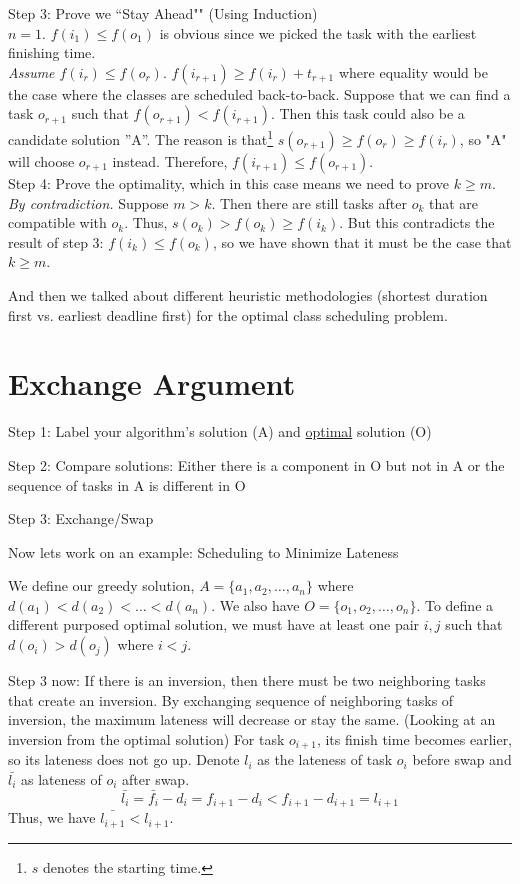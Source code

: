 \documentclass[11pt,letterpaper]{article}
\begin{document}
Step 3: Prove we ``Stay Ahead"" (Using Induction)\\
\textit{$n=1$}. $f(i_1) \leq f(o_1)$ is obvious since we picked the task with the earliest finishing time. \\
\textit{Assume $f(i_r) \leq f(o_r)$}. $f(i_{r+1}) \geq f(i_r) + t_{r+1}$ where equality would be the case where the classes are scheduled back-to-back. Suppose that we can find a task $o_{r+1}$ such that $f(o_{r+1}) < f(i_{r+1})$. Then this task could also be a candidate solution ''A''. The reason is that\footnote{$s$ denotes the starting time.} $s(o_{r+1}) \geq f(o_r) \geq f(i_r)$, so "A" will choose $o_{r+1}$ instead. Therefore, $f(i_{r+1}) \leq f(o_{r+1})$. \\

Step 4: Prove the optimality, which in this case means we need to prove $k \geq m$.\\
\textit{By contradiction.} Suppose $m > k$. Then there are still tasks after $o_k$ that are compatible with $o_k$. Thus, $s(o_k) > f(o_k) \geq f(i_k)$. But this contradicts the result of step 3: $f(i_k) \leq f(o_k)$, so we have shown that it must be the case that $k \geq m$.


And then we talked about different heuristic methodologies (shortest duration first vs. earliest deadline first) for the optimal class scheduling problem.

\section{Exchange Argument}
Step 1: Label your algorithm's solution (A) and \underline{optimal} solution (O)

Step 2: Compare solutions: Either there is a component in O but not in A or the sequence of tasks in A is different in O

Step 3: Exchange/Swap

Now lets work on an example: Scheduling to Minimize Lateness

We define our greedy solution, $A = \{a_1, a_2,\ldots, a_n\}$ where $d(a_1) < d(a_2) <\ldots<d(a_n)$. We also have $O = \{o_1, o_2,\ldots, o_n\}$. To define a different purposed optimal solution, we must have at least one pair $i, j$ such that $d(o_i) > d(o_j)$ where $i<j$. 

Step 3 now: If there is an inversion, then there must be two neighboring tasks that create an inversion. By exchanging sequence of neighboring tasks of inversion, the maximum lateness will decrease or stay the same. (Looking at an inversion from the optimal solution) For task $o_{i+1}$, its finish time becomes earlier, so its lateness does not go up. Denote $l_i$ as the lateness of task $o_i$ before swap and $\bar{l_i}$ as lateness of $o_i$ after swap. 
$$\bar{l_i} = \bar{f_i} - d_i = f_{i+1}-d_i < f_{i+1} - d_{i+1} = l_{i+1}$$
Thus, we have $\bar{l_{i+1}} < l_{i+1}$. 
\end{document}
